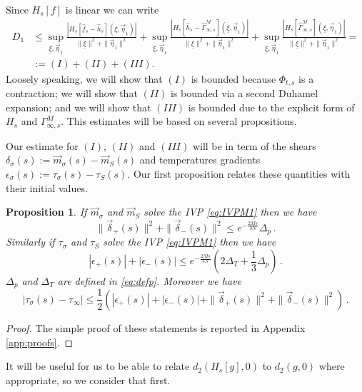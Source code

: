 \documentclass{article}
\newcommand\uxi{{\underline \xi}}
\newcommand\veta{{\vec \eta}}
\newtheorem{Prop}{Proposition}
\begin{document}
Since $H_s[f]$ is linear we can write
%
\[
\begin{aligned}
D_1&\leq \sup_{\uxi,\veta_{1}} \frac{|H_s[\hat {f}_s-\hat 
h_s](\uxi,\veta_{1})|}{\|\uxi\|^2+\|\veta_{1}\|^2}+
\sup_{\uxi,\veta_{1}} \frac{|H_s[\hat h_s-\widehat 
\Gamma^M_{\infty,s}](\uxi,\veta_{1})|}{\|\uxi\|^2+\|\veta_{1}\|^2}+
\sup_{\uxi,\veta_{1}} \frac{|H_s[\widehat 
\Gamma^M_{\infty,s}](\uxi,\veta_{1})|}{\|\uxi\|^2+\|\veta_{1}\|^2}=\\
&:= (I) + (II) + (III).
\end{aligned}
\]
%
Loosely speaking, we will show that $(I)$ is bounded because $\Phi_{t,s}$ is a contraction; we will show that $(II)$ is 
bounded via a second Duhamel expansion; and we will show that $(III)$ is bounded due to the explicit form of $H_s$ and 
$\Gamma^M_{\infty,s}$. This estimates will be based on several propositions. 

Our estimate for $(I)$, $(II)$ and $(III)$ will be in term of the shears $\delta_\sigma(s):=\vec m_\sigma(s)-\vec 
m_S(s)$ and temperatures gradients $\epsilon_\sigma(s):=\tau_\sigma(s)-\tau_S(s)$. Our first proposition relates these 
quantities with their initial values.

\begin{Prop}\label{Prop:Delta}
If $\vec m_\sigma$ and $\vec m_S$ solve the IVP \eqref{eq:IVPM1} then we have
\begin{equation}\label{eq:Deltaps}
\|\vec \delta_+(s)\|^2+\|\vec \delta_-(s)\|^2\leq e^{-\frac {2Ms}{3N}}\Delta_p\, .
\end{equation}
Similarly if $\tau_\sigma$ and $\tau_S$ solve the IVP \eqref{eq:IVPM1} then we have
\begin{equation}\label{eq:DeltaTs}
|\epsilon_+(s)|+|\epsilon_-(s)|\leq e^{-\frac {2Ms}{3N}}\left(2\Delta_T+\frac 13 \Delta_p\right)\, .
\end{equation}
$\Delta_p$ and $\Delta_T$ are defined in \eqref{eq:defp}. Moreover we have
\begin{equation}\label{eq:ttinf}
|\tau_\sigma(s)-\tau_\infty|\leq \frac 12(|\epsilon_+(s)|+|\epsilon_-(s)| + \|\vec \delta_+(s)\|^2+\|\vec 
\delta_-(s)\|^2)\, .
\end{equation}
\end{Prop}
\begin{proof} The simple proof of these statements is reported in Appendix \ref{app:proofs}.\end{proof}


It will be useful for us to be able to relate $d_2(H_s[g],0)$ to $d_2(g,0)$ where appropriate, so we consider that 
first. 
\end{document}
